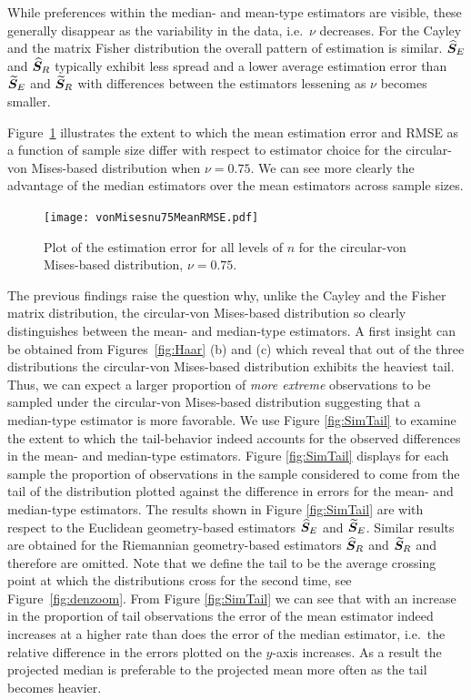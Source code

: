 While preferences within the median- and mean-type estimators are visible, these generally disappear as the variability in the data, i.e.~$\nu$ decreases.  For the Cayley and the matrix Fisher distribution the overall pattern of estimation is similar. ${\widehat{\bm S}_E}$ and ${\widehat{\bm S}_R}$ typically exhibit less spread and a lower average estimation error than ${\widetilde{\bm S}_E}$ and ${\widetilde{\bm S}_R}$ with differences between the estimators lessening as $\nu$ becomes smaller.

Figure~\ref{fig:vmnu75} illustrates the extent to which the mean estimation error and RMSE as a function of sample size differ with respect to estimator choice for the circular-von Mises-based distribution when $\nu=0.75$.  We can see more clearly the advantage of the median estimators over the mean estimators across sample sizes.
 \vspace{-1em}\begin{figure}[h!]
\centering
\texttt{[image: vonMisesnu75MeanRMSE.pdf]}\vspace{-1em}
\caption{Plot of the estimation error for all levels of $n$ for the circular-von Mises-based distribution,  $\nu=0.75$.}  \label{fig:vmnu75}
\end{figure}\vspace{-1em}
The previous findings raise the question why, unlike the Cayley and the Fisher matrix distribution, the circular-von Mises-based distribution so clearly distinguishes between the mean- and median-type estimators. A first insight can be obtained from Figures~\ref{fig:Haar} (b) and (c) which reveal that out of the three distributions the circular-von Mises-based distribution exhibits the heaviest tail. Thus, we can expect a larger proportion of   \textit{more extreme} observations to be sampled under the circular-von Mises-based distribution suggesting that a median-type estimator is more favorable. 
We use Figure \ref{fig:SimTail} to examine the extent to which the tail-behavior indeed accounts for the observed differences in the mean- and median-type estimators. Figure \ref{fig:SimTail} displays for each sample the proportion of observations in the sample considered to come from the tail of the distribution plotted against the difference in errors for the mean- and median-type estimators.  The results shown in Figure \ref{fig:SimTail} are with respect to the Euclidean geometry-based estimators ${\widehat{\bm S}_E}$ and ${\widetilde{\bm S}_E}$. Similar results are obtained for the Riemannian geometry-based estimators ${\widehat{\bm S}_R}$ and ${\widetilde{\bm S}_R}$ and therefore are omitted. Note that we define the tail to be the average crossing point at which the distributions cross for the second time, see Figure~\ref{fig:denzoom}. From  Figure \ref{fig:SimTail} we can see that with an increase in the proportion of tail observations the error of the mean estimator indeed increases at a higher rate than does the error of the median estimator, i.e.~the relative difference in the errors plotted on the $y$-axis increases. As a result the projected median is preferable to the projected mean more often as the tail becomes heavier.  \\
